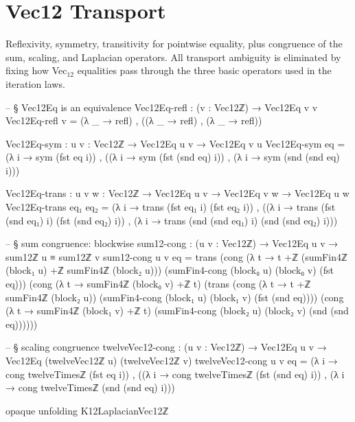 \documentclass[11pt,a4paper]{book}
\def\texorpdfstring#1#2{#2}%
\begin{document}
\section{Vec\texorpdfstring{$_{12}$}{12} Transport}

Reflexivity, symmetry, transitivity for pointwise equality, plus congruence
of the sum, scaling, and Laplacian operators. All
transport ambiguity is eliminated by fixing how Vec$_{12}$ equalities pass through the three
basic operators used in the iteration laws.

\begin{code}
-- § Vec12Eq is an equivalence
Vec12Eq-refl : (v : Vec12ℤ) → Vec12Eq v v
Vec12Eq-refl v = (λ _ → refl) , ((λ _ → refl) , (λ _ → refl))

Vec12Eq-sym : {u v : Vec12ℤ} → Vec12Eq u v → Vec12Eq v u
Vec12Eq-sym eq =
  (λ i → sym (fst eq i)) ,
  ((λ i → sym (fst (snd eq) i)) ,
   (λ i → sym (snd (snd eq) i)))

Vec12Eq-trans : {u v w : Vec12ℤ} → Vec12Eq u v → Vec12Eq v w → Vec12Eq u w
Vec12Eq-trans eq₁ eq₂ =
  (λ i → trans (fst eq₁ i) (fst eq₂ i)) ,
  ((λ i → trans (fst (snd eq₁) i) (fst (snd eq₂) i)) ,
   (λ i → trans (snd (snd eq₁) i) (snd (snd eq₂) i)))

-- § sum congruence: blockwise
sum12-cong : (u v : Vec12ℤ) → Vec12Eq u v → sum12ℤ u ≡ sum12ℤ v
sum12-cong u v eq =
  trans
    (cong (λ t → t +ℤ (sumFin4ℤ (block₁ u) +ℤ sumFin4ℤ (block₂ u)))
         (sumFin4-cong (block₀ u) (block₀ v) (fst eq)))
    (cong (λ t → sumFin4ℤ (block₀ v) +ℤ t)
      (trans
        (cong (λ t → t +ℤ sumFin4ℤ (block₂ u))
              (sumFin4-cong (block₁ u) (block₁ v) (fst (snd eq))))
        (cong (λ t → sumFin4ℤ (block₁ v) +ℤ t)
              (sumFin4-cong (block₂ u) (block₂ v) (snd (snd eq))))))

-- § scaling congruence
twelveVec12-cong : (u v : Vec12ℤ) → Vec12Eq u v → Vec12Eq (twelveVec12ℤ u) (twelveVec12ℤ v)
twelveVec12-cong u v eq =
  (λ i → cong twelveTimesℤ (fst eq i)) ,
  ((λ i → cong twelveTimesℤ (fst (snd eq) i)) ,
   (λ i → cong twelveTimesℤ (snd (snd eq) i)))

opaque
  unfolding K12LaplacianVec12ℤ


\end{code}
\end{document}
